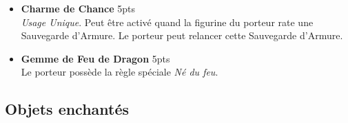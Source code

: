 \begin{multicols}{2}
\begin{itemize}[label={-}]
\item \textbf{Charme de Chance} \dotfill \unit{5}{pts} \\
\emph{Usage Unique}. Peut être activé quand la figurine du porteur rate une Sauvegarde d'Armure. Le porteur peut relancer cette Sauvegarde d'Armure.

\item \textbf{Gemme de Feu de Dragon} \dotfill \unit{5}{pts} \\
Le porteur possède la règle spéciale \emph{Né du feu}.

\end{itemize}
\end{multicols}

\newpage

\subsection{Objets enchantés}


